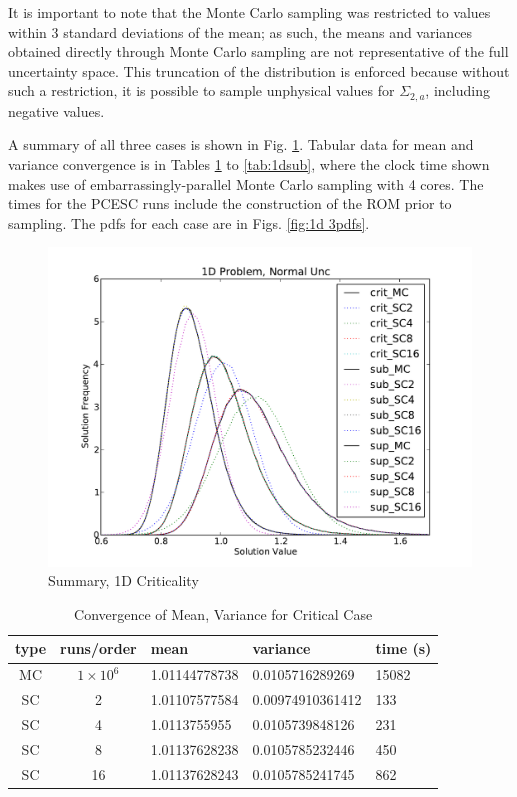 It is important to note that the Monte Carlo sampling was restricted to values within 3 standard deviations of the mean; as such, the means and variances obtained directly through Monte Carlo sampling are not representative of the full uncertainty space.  This truncation of the distribution is enforced because without such a restriction, it is possible to sample unphysical values for $\Sigma_{2,a}$, including negative values.

A summary of all three cases is shown in Fig. \ref{1d_all}.  Tabular data for mean and variance convergence is in Tables \ref{tab:1dcrit} to \ref{tab:1dsub}, where the clock time shown makes use of embarrassingly-parallel Monte Carlo sampling with 4 cores.  The times for the PCESC runs include the construction of the ROM prior to sampling.  The pdfs for each case are in Figs. \ref{fig:1d 3pdfs}.  

\begin{figure}[h!]
\centering
   \includegraphics[width=.75\textwidth]{../graphics/1dall_normal_pdfs}
   \caption{Summary, 1D Criticality}
   \label{1d_all}
\end{figure}

\begin{table}
\begin{center}
\begin{tabular}{c c|l l l}
type & runs/order & mean & variance & time (s) \\ \hline
MC & $1\times10^6$ & 1.01144778738 & 0.0105716289269 & 15082  \\
SC & 2 & 1.01107577584 & 0.00974910361412 & 133 \\
SC & 4 & 1.0113755955 & 0.0105739848126 & 231\\
SC & 8 & 1.01137628238 & 0.0105785232446 & 450\\
SC & 16 & 1.01137628243 & 0.0105785241745 & 862
\end{tabular}
\end{center}
\caption{Convergence of Mean, Variance for Critical Case}
\label{tab:1dcrit}
\end{table}

